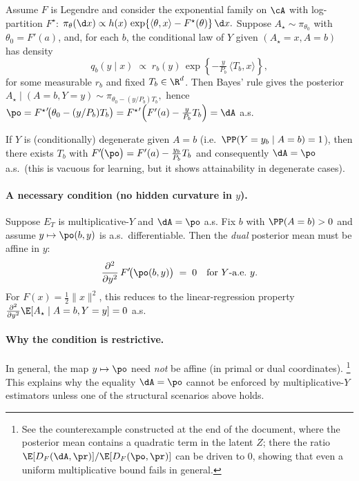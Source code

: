 \begin{corollary}
    \label{cor:mirror-conjugacy}
    Assume $F$ is Legendre and consider the exponential family on $\cA$ with log-partition $F^\star$:
    \(
    \pi_\theta(\d x)\propto h(x)\,\exp\{\langle\theta,x\rangle - F^\star(\theta)\}\,\d x.
    \)
    Suppose $A_\star\sim \pi_{\theta_0}$ with $\theta_0=F'(a)$, and, for each $b$,
    the conditional law of $Y$ given $(A_\star=x,A=b)$ has density
    \[
        q_b(y\mid x) \;\propto\; r_b(y)\,\exp\!\left\{-\tfrac{y}{P_b}\,\langle T_b, x\rangle\right\},
    \]
    for some measurable $r_b$ and fixed $T_b\in\R^d$.
    Then Bayes' rule gives the posterior
    \(
    A_\star\mid (A=b,Y=y)\sim \pi_{\theta_0-(y/P_b)T_b},
    \)
    hence
    \(
    \po={F^\star}'\!\big(\theta_0-(y/P_b)T_b\big)
    ={F^\star}'\!\left(F'(a)-\tfrac{y}{P_b}T_b\right)=\dA
    \)
    a.s.
\end{corollary}

\begin{corollary}[Degenerate $Y$]
    \label{cor:degenerate}
    If $Y$ is (conditionally) degenerate given $A=b$ (i.e.\ $\PP(Y=y_b\mid A=b)=1$), then there exists $T_b$ with
    \(
    F'\!\big(\po\big)=F'(a)-\tfrac{y_b}{P_b}T_b
    \)
    and consequently $\dA=\po$ a.s.\ (this is vacuous for learning, but it shows attainability in degenerate cases).
\end{corollary}

\paragraph{A necessary condition (no hidden curvature in \texorpdfstring{$y$}{y}).}
\begin{lemma}
    \label{lem:affine-necessary}
    Suppose $E_T$ is multiplicative-$Y$ and $\dA=\po$ a.s.
    Fix $b$ with $\PP(A=b)>0$ and assume $y\mapsto \po(b,y)$ is a.s.\ differentiable.
    Then the \emph{dual} posterior mean must be affine in $y$:
    \[
        \frac{\partial^2}{\partial y^2}\,F'\!\big(\po(b,y)\big) \;=\; 0
        \quad\text{for $Y$-a.e.\ $y$.}
    \]
    For $F(x)=\tfrac12\|x\|^2$, this reduces to the linear-regression property
    $\frac{\partial^2}{\partial y^2}\E[A_\star\mid A=b,Y=y]=0$ a.s.
\end{lemma}

\paragraph{Why the condition is restrictive.}
In general, the map $y\mapsto \po$ need \emph{not} be affine (in primal or dual coordinates).%
\footnote{See the counterexample constructed at the end of the document, where the posterior mean contains a quadratic term in the latent $Z$; there the ratio $\E[D_F(\dA,\pr)]/\E[D_F(\po,\pr)]$ can be driven to $0$, showing that even a uniform multiplicative bound fails in general.}
This explains why the equality $\dA=\po$ cannot be enforced by multiplicative-$Y$ estimators unless one of the structural scenarios above holds.

